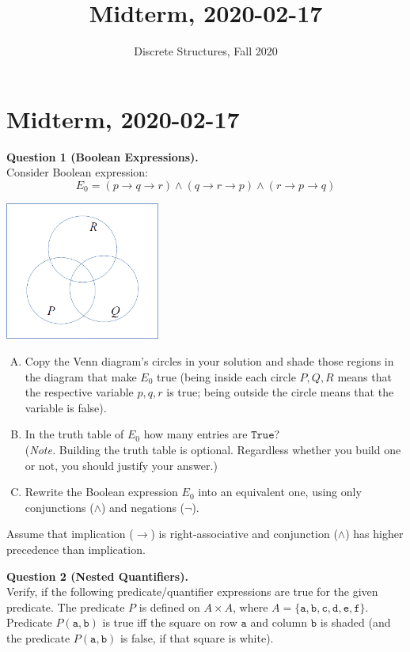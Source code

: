 \documentclass[jou]{apa6}
\title{Midterm, 2020-02-17}
\author{Discrete Structures, Fall 2020}
\affiliation{RBS}
\begin{document}

\twocolumn
\section{Midterm, 2020-02-17}

\vspace{6pt}
{\bf Question 1 (Boolean Expressions).}\\
Consider Boolean expression:
$$E_0 = (p \rightarrow q \rightarrow r) \wedge (q \rightarrow r \rightarrow p) \wedge (r \rightarrow p \rightarrow q)$$
\begin{center}
\includegraphics[width=2in]{midterm/circles.png}
\end{center}

\begin{enumerate}[(A)]
\item Copy the Venn diagram's circles in your solution and shade those regions in the diagram that make $E_0$ true
(being inside each circle $P,Q,R$ means that the respective variable $p,q,r$ is true; being outside the circle means
that the variable is false). 
\item In the truth table of $E_0$ how many entries are $\mathtt{True}$?\\
({\em Note.} Building the truth table is optional. Regardless whether you build one or not, you should justify your answer.)
\item Rewrite the Boolean expression $E_0$ into an equivalent one, using 
only conjunctions ($\wedge$) and negations ($\neg$). 
\end{enumerate}

Assume that implication ($\rightarrow$) is right-associative 
and conjunction ($\wedge$) has higher precedence than implication. 



\vspace{10pt}
{\bf Question 2 (Nested Quantifiers).}\\
Verify, if the following predicate/quantifier expressions are true for the given predicate. 
The predicate $P$ is defined on $A \times A$, where
$A = \{ \mathtt{a},\mathtt{b},\mathtt{c},\mathtt{d},\mathtt{e},\mathtt{f} \}$. 
Predicate $P(\mathtt{a},\mathtt{b})$ is true iff the square on row $\mathtt{a}$
and column $\mathtt{b}$ is shaded (and the predicate $P(\mathtt{a},\mathtt{b})$ 
is false, if that square is white).
\end{document}
